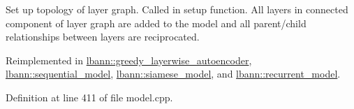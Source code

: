 Set up topology of layer graph. Called in setup function. All layers in connected component of layer graph are added to the model and all parent/child relationships between layers are reciprocated. 

Reimplemented in \hyperlink{classlbann_1_1greedy__layerwise__autoencoder_a115607e435ae4685531a81852ce01fe7}{lbann\+::greedy\+\_\+layerwise\+\_\+autoencoder}, \hyperlink{classlbann_1_1sequential__model_a3801a58530388fb6a8cb3e1c018e827d}{lbann\+::sequential\+\_\+model}, \hyperlink{classlbann_1_1siamese__model_a7ff41cffb060500605124959f1a2a6cf}{lbann\+::siamese\+\_\+model}, and \hyperlink{classlbann_1_1recurrent__model_ac89ddfa607e5cb6b940eb389ebbce6f6}{lbann\+::recurrent\+\_\+model}.



Definition at line 411 of file model.\+cpp.


